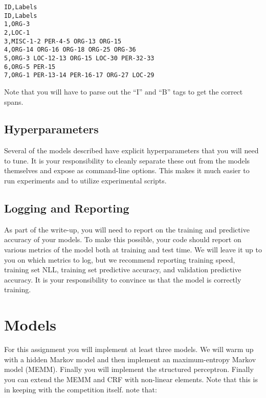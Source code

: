 \documentclass[11pt]{article}
\begin{document}
\begin{verbatim}
ID,Labels
ID,Labels
1,ORG-3
2,LOC-1
3,MISC-1-2 PER-4-5 ORG-13 ORG-15
4,ORG-14 ORG-16 ORG-18 ORG-25 ORG-36
5,ORG-3 LOC-12-13 ORG-15 LOC-30 PER-32-33
6,ORG-5 PER-15
7,ORG-1 PER-13-14 PER-16-17 ORG-27 LOC-29
\end{verbatim}

\noindent Note that you will have to parse out the ``I'' and ``B'' tags to get the correct spans.


\subsection{Hyperparameters}

Several of the models described have explicit hyperparameters that you will 
need to tune. It is your responsibility to cleanly separate these out from 
the models themselves and expose as command-line options. This makes it much 
easier to run experiments and to utilize experimental scripts. 

\subsection{Logging and Reporting}

As part of the write-up, you will need to report on the training and
predictive accuracy of your models. To make this possible, your code
should report on various metrics of the model both at training and
test time. We will leave it up to you on which metrics to log, but we
recommend reporting training speed, training set NLL, training set
predictive accuracy, and validation predictive accuracy. It is your
responsibility to convince us that the model is correctly training.

\section{Models}

For this assignment you will implement at least three models. We will
warm up with a hidden Markov model and then implement an
maximum-entropy Markov model (MEMM).  Finally you will implement the
structured perceptron. Finally you can extend the MEMM and CRF with
non-linear elements. Note that this is in keeping with the competition
itself. \citet{tjong2003introduction} note that:
\end{document}
